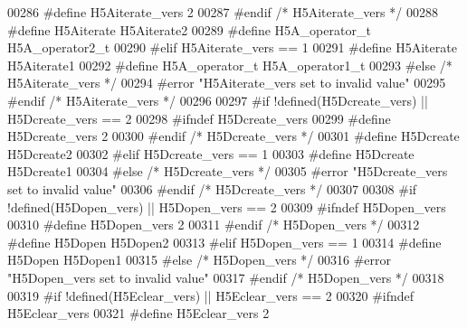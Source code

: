 \begin{DoxyCode}
00286 \textcolor{preprocessor}{    #define H5Aiterate\_vers 2}
00287 \textcolor{preprocessor}{  #endif }\textcolor{comment}{/* H5Aiterate\_vers */}\textcolor{preprocessor}{}
00288 \textcolor{preprocessor}{  #define H5Aiterate H5Aiterate2}
00289 \textcolor{preprocessor}{  #define H5A\_operator\_t H5A\_operator2\_t}
00290 \textcolor{preprocessor}{#elif H5Aiterate\_vers == 1}
00291 \textcolor{preprocessor}{  #define H5Aiterate H5Aiterate1}
00292 \textcolor{preprocessor}{  #define H5A\_operator\_t H5A\_operator1\_t}
00293 \textcolor{preprocessor}{#else }\textcolor{comment}{/* H5Aiterate\_vers */}\textcolor{preprocessor}{}
00294 \textcolor{preprocessor}{  #error "H5Aiterate\_vers set to invalid value"}
00295 \textcolor{preprocessor}{#endif }\textcolor{comment}{/* H5Aiterate\_vers */}\textcolor{preprocessor}{}
00296 
00297 \textcolor{preprocessor}{#if !defined(H5Dcreate\_vers) || H5Dcreate\_vers == 2}
00298 \textcolor{preprocessor}{  #ifndef H5Dcreate\_vers}
00299 \textcolor{preprocessor}{    #define H5Dcreate\_vers 2}
00300 \textcolor{preprocessor}{  #endif }\textcolor{comment}{/* H5Dcreate\_vers */}\textcolor{preprocessor}{}
00301 \textcolor{preprocessor}{  #define H5Dcreate H5Dcreate2}
00302 \textcolor{preprocessor}{#elif H5Dcreate\_vers == 1}
00303 \textcolor{preprocessor}{  #define H5Dcreate H5Dcreate1}
00304 \textcolor{preprocessor}{#else }\textcolor{comment}{/* H5Dcreate\_vers */}\textcolor{preprocessor}{}
00305 \textcolor{preprocessor}{  #error "H5Dcreate\_vers set to invalid value"}
00306 \textcolor{preprocessor}{#endif }\textcolor{comment}{/* H5Dcreate\_vers */}\textcolor{preprocessor}{}
00307 
00308 \textcolor{preprocessor}{#if !defined(H5Dopen\_vers) || H5Dopen\_vers == 2}
00309 \textcolor{preprocessor}{  #ifndef H5Dopen\_vers}
00310 \textcolor{preprocessor}{    #define H5Dopen\_vers 2}
00311 \textcolor{preprocessor}{  #endif }\textcolor{comment}{/* H5Dopen\_vers */}\textcolor{preprocessor}{}
00312 \textcolor{preprocessor}{  #define H5Dopen H5Dopen2}
00313 \textcolor{preprocessor}{#elif H5Dopen\_vers == 1}
00314 \textcolor{preprocessor}{  #define H5Dopen H5Dopen1}
00315 \textcolor{preprocessor}{#else }\textcolor{comment}{/* H5Dopen\_vers */}\textcolor{preprocessor}{}
00316 \textcolor{preprocessor}{  #error "H5Dopen\_vers set to invalid value"}
00317 \textcolor{preprocessor}{#endif }\textcolor{comment}{/* H5Dopen\_vers */}\textcolor{preprocessor}{}
00318 
00319 \textcolor{preprocessor}{#if !defined(H5Eclear\_vers) || H5Eclear\_vers == 2}
00320 \textcolor{preprocessor}{  #ifndef H5Eclear\_vers}
00321 \textcolor{preprocessor}{    #define H5Eclear\_vers 2}

\end{DoxyCode}
